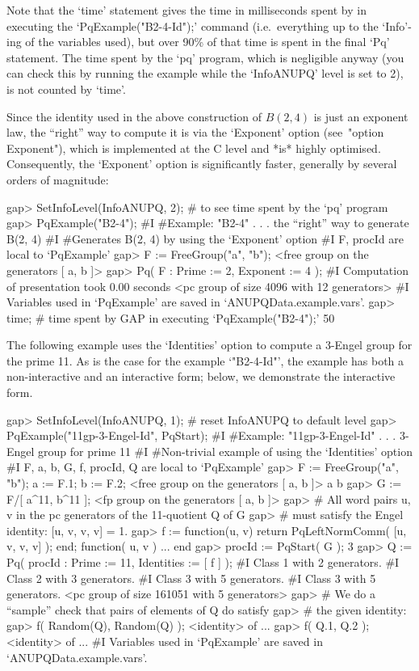 Note that the `time' statement gives the time in  milliseconds  spent  by
{\GAP} in executing the `PqExample("B2-4-Id");' command  (i.e.~everything
up to the `Info'-ing of the variables used), but over 90\% of  that  time
is spent in the final `Pq' statement. The time spent by the `pq' program,
which is negligible anyway (you can check this  by  running  the  example
while the `InfoANUPQ' level is set to 2), is not counted by `time'.

Since the identity used in the above construction of $B(2, 4)$ is just an
exponent law, the ``right'' way to  compute  it  is  via  the  `Exponent'
option (see~"option Exponent"), which is implemented at the C  level  and
*is*  highly  optimised.   Consequently,   the   `Exponent'   option   is
significantly faster, generally by several orders of magnitude:

\begintt
gap> SetInfoLevel(InfoANUPQ, 2); # to see time spent by the `pq' program
gap> PqExample("B2-4");
#I  #Example: "B2-4" . . . the ``right'' way to generate B(2, 4)
#I  #Generates B(2, 4) by using the `Exponent' option
#I  F, procId are local to `PqExample'
gap> F := FreeGroup("a", "b");
<free group on the generators [ a, b ]>
gap> Pq( F : Prime := 2, Exponent := 4 );
#I  Computation of presentation took 0.00 seconds
<pc group of size 4096 with 12 generators>
#I  Variables used in `PqExample' are saved in `ANUPQData.example.vars'.
gap> time; # time spent by GAP in executing `PqExample("B2-4");' 
50
\endtt

The following example uses the `Identities' option to compute  a  3-Engel
group for the prime 11. As is the case for the example  `"B2-4-Id"',  the
example has both a non-interactive and an  interactive  form;  below,  we
demonstrate the interactive form.

\begintt
gap> SetInfoLevel(InfoANUPQ, 1); # reset InfoANUPQ to default level
gap> PqExample("11gp-3-Engel-Id", PqStart);
#I  #Example: "11gp-3-Engel-Id" . . . 3-Engel group for prime 11
#I  #Non-trivial example of using the `Identities' option
#I  F, a, b, G, f, procId, Q are local to `PqExample'
gap> F := FreeGroup("a", "b"); a := F.1; b := F.2;
<free group on the generators [ a, b ]>
a
b
gap> G := F/[ a^11, b^11 ];
<fp group on the generators [ a, b ]>
gap> # All word pairs u, v in the pc generators of the 11-quotient Q of G 
gap> # must satisfy the Engel identity: [u, v, v, v] = 1.
gap> f := function(u, v) return PqLeftNormComm( [u, v, v, v] ); end;
function( u, v ) ... end
gap> procId := PqStart( G );
3
gap> Q := Pq( procId : Prime := 11, Identities := [ f ] );
#I  Class 1 with 2 generators.
#I  Class 2 with 3 generators.
#I  Class 3 with 5 generators.
#I  Class 3 with 5 generators.
<pc group of size 161051 with 5 generators>
gap> # We do a ``sample'' check that pairs of elements of Q do satisfy
gap> # the given identity:
gap> f( Random(Q), Random(Q) );
<identity> of ...
gap> f( Q.1, Q.2 );
<identity> of ...
#I  Variables used in `PqExample' are saved in `ANUPQData.example.vars'.
\endtt

